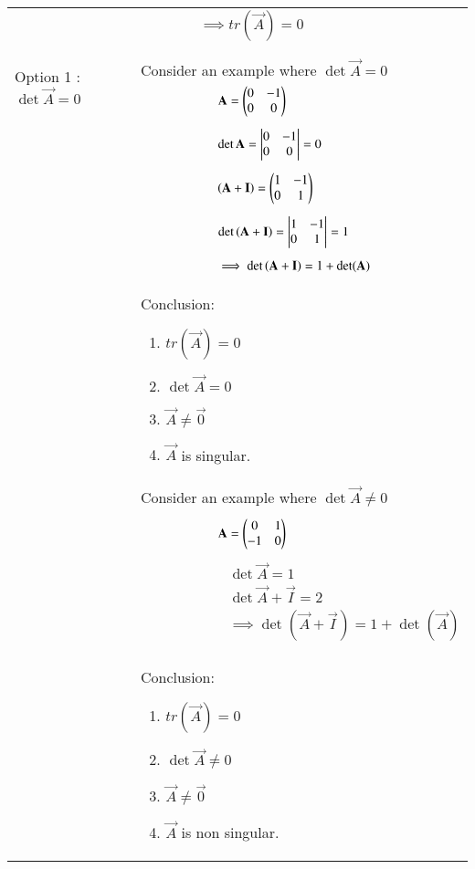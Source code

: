 \documentclass[journal,12pt]{IEEEtran}
\begin{document}
\begin{longtable}{|p{5cm}|p{13cm}|}
    &$\qquad\qquad\implies\boxed{ tr(\vec{A})=0}$\\
    &\\
    \hline
  	\multirow{3}{*}{Option 1 : $\det\vec{A}=0$ } 
	& \\
	& Consider an example where $\det{\vec{A}}=0$\\
	& $\qquad\qquad\qquad\mathbf{A}=\begin{pmatrix}0&-1\\0&0\end{pmatrix}$\\
	&\\
	& $\qquad\qquad\qquad\det{\mathbf{A}} = \begin{vmatrix}0&-1\\0&0\end{vmatrix} = 0$\\
	&\\
	& $\qquad\qquad\qquad\left(\mathbf{A}+\mathbf{I}\right)=\begin{pmatrix}1&-1\\0&1\end{pmatrix}$\\
	&\\
	& $\qquad\qquad\qquad\det\left(\mathbf{A}+\mathbf{I}\right)=\begin{vmatrix}1&-1\\0&1\end{vmatrix}=1$\\
	&\\
	& $\qquad\qquad\qquad\implies\det\left(\mathbf{A}+\mathbf{I}\right)=1+\det(\mathbf{A
	})$\\
	& Conclusion: {\begin{enumerate}
	\item $tr(\vec{A})=0$
	\item $\det{\vec{A}}= 0$
	\item $\vec{A} \neq \vec{0}$
	\item $\vec{A}$ is  singular.\end{enumerate}}\\
	& Consider an example where $\det{\vec{A}}\neq 0$\\
	&\\
	& $\qquad\qquad\qquad\mathbf{A}=\begin{pmatrix}0&1\\-1&0\end{pmatrix}$\\
	&\\
	& $\qquad\qquad\qquad\det{\vec{A}}= 1$\\
	& $\qquad\qquad\qquad\det{\vec{A}+\vec{I}}= 2$\\
	& $\qquad\qquad\qquad\implies \det(\vec{A}+\vec{I})= 1+\det(\vec{A})$\\
	&\\
	& Conclusion: {\begin{enumerate}
	\item $tr(\vec{A})=0$
	\item $\det{\vec{A}}\neq 0$
	\item $\vec{A} \neq \vec{0}$
	\item $\vec{A}$ is non singular.\end{enumerate}}\\
	

\end{longtable}
\end{document}
